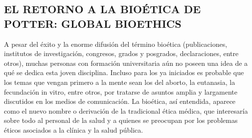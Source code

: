 \documentclass[12pt,letterpaper]{article}
\begin{document}
\begin{multicols}{2}
\section*{\small{EL RETORNO A LA BIOÉTICA DE POTTER:
GLOBAL BIOETHICS}} 
\noindent A pesar del éxito y la enorme difusión del término bioética (publicaciones, institutos de investigación, congresos, grados y posgrados, declaraciones, entre otros), muchas personas con formación universitaria aún no poseen una idea de a qué se dedica esta joven disciplina. Incluso para los ya iniciados es probable que los temas que vengan primero a la mente sean los del aborto, la eutanasia, la fecundación in vitro, entre otros, por tratarse de asuntos amplia y largamente discutidos en los medios de comunicación. La bioética, así entendida, aparece como el nuevo nombre o derivación de la tradicional ética médica, que interesaría sobre todo al personal de la salud y a quienes se preocupan por los problemas éticos asociados a la clínica y la salud pública. 
\end{multicols}
\newpage
\end{document}
